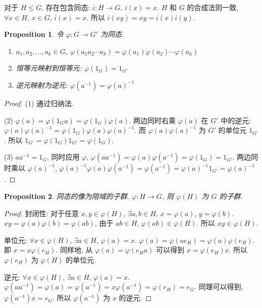 \documentclass[UTF8]{ctexart}
\theoremstyle{mystyle}
\newtheorem{proposition}{Proposition}[section]
\theoremstyle{myremark}
\theoremstyle{plain}
\begin{document}
对于 $ H \le G $, 存在包含同态: $ i \colon H \to G $, $ i(x) = x $. $ H $ 和 $ G $ 的合成法则一致, $ \forall x \in H $, $ x \in G $, $ i(x) = x $. 所以 $ i (x y) = x y = i(x) i(y) $.

\begin{proposition}
    令 $ \varphi \colon G \to G' $ 为同态. 
    \begin{enumerate}
        \item $ a_1, a_2, \dots, a_k \in G $, $ \varphi(a_1 a_2 \cdots a_k) = \varphi(a_1) \varphi(a_2) \cdots \varphi(a_k) $
        \item 恒等元映射到恒等元: $ \varphi(1_G) = 1_{G'} $
        \item 逆元映射为逆元: $ \varphi(a^{-1}) = \varphi(a)^{-1} $
    \end{enumerate}
\end{proposition}


\begin{proof}
    (1) 通过归纳法.

    (2) $ \varphi(a) = \varphi(1_G a) = \varphi(1_G) \varphi(a) $. 两边同时右乘 $ \varphi(a) $ 在 $ G' $ 中的逆元: $ \varphi(a) \varphi(a)^{-1} = \varphi(1_G) \varphi(a) \varphi(a)^{-1} $. 而 $ \varphi(a) \varphi(a)^{-1} $ 为 $ G' $ 的单位元 $ 1_{G'} $. 所以 $ 1_{G'} = \varphi(1_G) 1_{G'} = \varphi(1_G) $.

    (3) $ a a^{-1} = 1_G $, 同时应用 $ \varphi $, $ \varphi(a a^{-1}) = \varphi(a) \varphi(a^{-1}) = \varphi(1_G) = 1_{G'} $. 两边同时乘以 $ \varphi(a)^{-1} $, $ \varphi(a)^{-1} \varphi(a) \varphi(a^{-1}) = \varphi(a^{-1}) = \varphi(a)^{-1} 1_{G'} = \varphi(a)^{-1} $.
\end{proof}

\begin{proposition}
    同态的像为陪域的子群. $ \varphi \colon H \to G $, 则 $ \varphi(H) $ 为 $ G $ 的子群.
\end{proposition}

\begin{proof}
    封闭性: 对于任意 $ x, y \in \varphi(H) $, $ \exists a, b \in H $, $ x = \varphi(a) $, $ y = \varphi(b) $. $ x y = \varphi(a) \varphi(b) = \varphi(a b) $, 由于 $ ab \in H $, $ \varphi(a b) \in \varphi(H) $. 所以 $ x y \in \varphi(H) $.

    单位元: $ \forall x \in \varphi(H) $, $ \exists a \in H $, $ \varphi(a) = x $. $ \varphi(a) = \varphi(a e_H) = \varphi(a) \varphi(e_H) $. 即 $ x = x \varphi(e_H) $. 同样地, 从 $ \varphi(a) = \varphi(e_H a) $ 可以得到 $ x = \varphi(e_H) x $. 所以 $ \varphi(e_H) $ 为 $ \varphi(H) $ 的单位元.

    逆元: $ \forall x \in \varphi(H) $, $ \exists a \in H $, $ \varphi(a) = x $. $ \varphi(a a^{-1}) = \varphi(a) = \varphi(a^{-1}) = x \varphi(a^{-1}) = \varphi(e_H) = e_G $. 同理可以得到, $ \varphi(a^{-1}) x = e_G $. 所以 $ \varphi(a^{-1}) $ 为 $ x $ 的逆元.
\end{proof}
\end{document}
